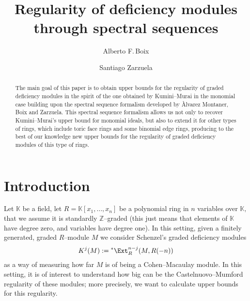 \documentclass[11pt]{amsart}
\begin{document}
\author[A.\,F.\,Boix]{Alberto F.\,Boix}
\address{Department of Mathematics, Universitat Polit\`ecnica de Catalunya BarcelonaTech, Av. Eduard Maristany 16, 08019, Barcelona, Spain.}

\author[S. Zarzuela]{Santiago Zarzuela}
\address{Departament de Matem\`atiques i Inform\`atica, Universitat de Barcelona, Gran Via de les Corts Catalanes 585, 08007, Barcelona, SPAIN}

\title[On deficiency modules]{Regularity of deficiency modules through spectral sequences}



\begin{abstract}
The main goal of this paper is to obtain upper bounds for the regularity of graded deficiency modules in the spirit of the one obtained by Kumini--Murai in the monomial case building upon the spectral sequence formalism developed by \`Alvarez Montaner, Boix and Zarzuela. This spectral sequence formalism allows us not only to recover Kumini--Murai's upper bound for monomial ideals, but also to extend it for other types of rings, which include toric face rings and some binomial edge rings, producing to the best of our knowledge new upper bounds for the regularity of graded deficiency modules of this type of rings.
\end{abstract}

\maketitle

\section*{Introduction}
Let $\mathbb{K}$ be a field, let $R=\mathbb{K}[x_1,\ldots, x_n]$ be a polynomial ring in $n$ variables over $\mathbb{K},$ that we assume it is standardly $\mathbb{Z}$--graded (this just means that elements of $\mathbb{K}$ have degree zero, and variables have degree one). In this setting, given a finitely generated, graded $R$--module $M$ we consider Schenzel's graded deficiency modules
\[
K^j (M):=\hbox{}^* \Ext_R^{n-j} (M,R(-n))
\]
as a way of measuring how far $M$ is of being a Cohen--Macaulay module. In this setting, it is of interest to understand how big can be the Castelnuovo--Mumford regularity of these modules; more precisely, we want to calculate upper bounds for this regularity.
\end{document}
